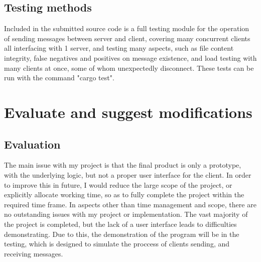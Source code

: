 \documentclass{article}
\begin{document}
\subsection{Testing methods}
Included in the submitted source code is a full testing module for the operation of sending messages between server and client, covering many concurrent clients all interfacing with 1 server, and testing many aspects, such as file content integrity, false negatives and positives on message existence, and load testing with many clients at once, some of whom unexpectedly disconnect. These tests can be run with the command "cargo test".
\section{Evaluate and suggest modifications}
\subsection{Evaluation}
The main issue with my project is that the final product is only a prototype, with the underlying logic, but not a proper user interface for the client. In order to improve this in future, I would reduce the large scope of the project, or explicitly allocate working time, so as to fully complete the project within the required time frame. In aspects other than time management and scope, there are no outstanding issues with my project or implementation. The vast majority of the project is completed, but the lack of a user interface leads to difficulties demonstrating. Due to this, the demonstration of the program will be in the testing, which is designed to simulate the proccess of clients sending, and receiving messages.
\end{document}
